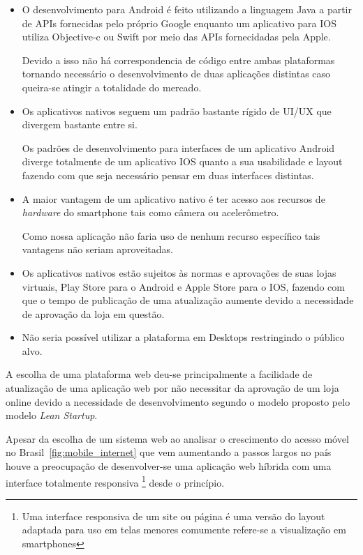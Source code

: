 \begin{itemize}
\item O desenvolvimento para Android é feito utilizando a linguagem Java a partir de APIs fornecidas pelo próprio Google enquanto um aplicativo para IOS utiliza Objective-c ou Swift por meio das APIs fornecidadas pela Apple.
\par Devido a isso não há correspondencia de código entre ambas plataformas tornando necessário o desenvolvimento de duas aplicações distintas caso queira-se atingir a totalidade do mercado.
\item Os aplicativos nativos seguem um padrão bastante rígido de UI/UX que divergem bastante entre si. 
\par Os padrões de desenvolvimento para interfaces  de um aplicativo Android diverge totalmente de um aplicativo IOS  quanto a sua usabilidade e layout fazendo com que seja necessário pensar em duas interfaces distintas.
\item A maior vantagem de um aplicativo nativo é ter acesso aos recursos de \emph{hardware} do smartphone tais como câmera ou acelerômetro.
\par Como nossa aplicação não faria uso de nenhum recurso específico tais vantagens não seriam aproveitadas.
\item Os aplicativos nativos estão sujeitos às normas e aprovações de suas lojas virtuais, Play Store para  o Android e Apple Store para o IOS, fazendo com que o tempo de publicação de uma atualização aumente devido a necessidade de aprovação da loja em questão.
\item Não seria possível utilizar a plataforma em Desktops restringindo o público alvo.
\end{itemize}
\par A escolha de uma plataforma web deu-se principalmente a facilidade de atualização de uma aplicação web por não necessitar da aprovação de um loja online devido a necessidade de desenvolvimento segundo o modelo proposto pelo modelo \emph{Lean Startup}.
\par Apesar da escolha de um sistema web ao analisar o crescimento do acesso móvel no Brasil~\ref{fig:mobile_internet} que vem aumentando a passos largos no país houve a preocupação de desenvolver-se uma aplicação web híbrida com uma interface totalmente responsiva \footnote{ Uma interface responsiva de um site ou página é uma versão do layout adaptada para uso em telas menores comumente refere-se a visualização em smartphones} desde o princípio.
